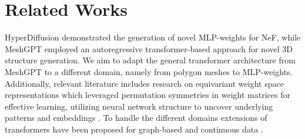 \section{Related Works}
\label{sec:literature}



HyperDiffusion \cite{erkoç2023hyperdiffusion} demonstrated the generation of novel MLP-weights for NeF, while MeshGPT \cite{siddiqui2023meshgpt} employed an autoregressive transformer-based approach for novel 3D structure generation. We aim to adapt the general transformer architecture from MeshGPT \cite{siddiqui2023meshgpt} to a different domain, namely from polygon meshes to MLP-weights.
Additionally, relevant literature includes research on equivariant weight space representations \cite{navon2023equivariant, navon2024equivariant} which leveraged permutation symmetries in weight matrices for effective learning, utilizing neural network structure to uncover underlying patterns and embeddings \cite{lim2023graph,andreis2023setbased}. To handle the different domains extensions of transformers have been proposed for graph-based \cite{diao2023relational} and continuous data \cite{born2023regression,mao2022poseur}.